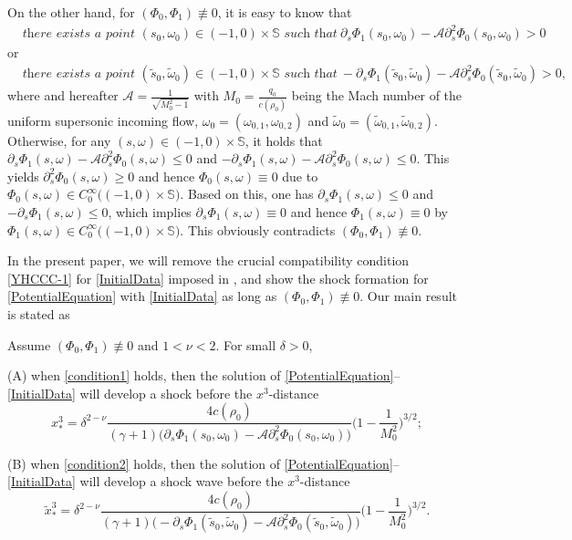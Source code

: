 \documentclass[11pt,twoside]{article}
\def\f{\frac}
\def\dps{\displaystyle}
\begin{document}
On the other hand, for $(\Phi_0, \Phi_1)\not\equiv0$, it is easy to know that
\begin{align}\label{condition1}
&\textit{there exists a point $(s_0, \omega_0) \in (-1, 0) \times \mathbb{S}$\ such that}\ \partial_s\Phi_1(s_0,\omega_0)-\mathcal A\partial_s^2\Phi_0(s_0,\omega_0)>0
\end{align}
or
\begin{align}\label{condition2}
&\textit{there exists a point $(\tilde s_0, \tilde\omega_0) \in (-1, 0) \times \mathbb{S}$\  such that}\ -\partial_s\Phi_1(\tilde s_0,\tilde \omega_0)-\mathcal A\partial_s^2\Phi_0(\tilde s_0,\tilde \omega_0)>0,
\end{align}
where and hereafter $\mathcal A=\dps\frac{1}{\sqrt{M_0^2-1}}$ with $M_0=\dps\f{q_0}{c(\rho_0)}$ being the Mach number of the
uniform supersonic incoming flow, $\omega_0=(\omega_{0,1},\omega_{0,2})$ and $\tilde\omega_0=(\tilde\omega_{0,1}, \tilde\omega_{0,2})$.
Otherwise, for any $(s, \omega) \in (-1, 0) \times \mathbb{S}$, it holds that
$\partial_s\Phi_1(s,\omega)-\mathcal A\partial_s^2\Phi_0(s,\omega)\le 0$
and $-\partial_s\Phi_1(s,\omega)-\mathcal A\partial_s^2\Phi_0(s,\omega)\le 0$.
This yields $\partial_s^2\Phi_0(s,\omega)\ge 0$ and hence $\Phi_0(s,\omega)\equiv0$ due to $\Phi_0(s, \omega) \in C_0^\infty\big((-1, 0) \times \mathbb{S}\big)$. Based on this, one has $\partial_s\Phi_1(s,\omega)\le 0$
and $-\partial_s\Phi_1(s,\omega)\le 0$, which implies $\partial_s\Phi_1(s,\omega)\equiv0$
and hence $\Phi_1(s,\omega)\equiv0$ by $\Phi_1(s, \omega) \in C_0^\infty\big((-1, 0) \times \mathbb{S}\big)$.
This obviously contradicts $(\Phi_0, \Phi_1)\not\equiv0$.


In the present paper, we will remove the crucial compatibility condition \eqref{YHCCC-1}  for \eqref{InitialData} imposed
in \cite{Ch2,K-R,M-Y,L-Y}, and show the shock formation for \eqref{PotentialEquation}
with \eqref{InitialData} as long as $(\Phi_0, \Phi_1)\not\equiv0$. Our main result is stated as


\begin{theorem}\label{maintheorem}
Assume $(\Phi_0, \Phi_1)\not\equiv 0$ and $1<\nu<2$. For small $\delta>0$,

(A) when \eqref{condition1} holds, then the solution of \eqref{PotentialEquation}--\eqref{InitialData}
will develop a shock before the $x^3$-distance
\begin{equation}\label{distance1}
x^3_* = \delta^{2-\nu}\frac{4c(\rho_0)}{(\gamma+1)\big(\partial_s\Phi_1(s_0,\omega_0)-\mathcal A\partial_s^2\Phi_0(s_0,\omega_0)\big)}\big(1-\frac{1}{M_0^2}\big)^{3/2};
\end{equation}

(B) when \eqref{condition2} holds,
then the solution of  \eqref{PotentialEquation}--\eqref{InitialData} will develop a shock wave before the $x^3$-distance
\begin{equation}\label{distance2}
\tilde x^3_* = \delta^{2-\nu}\frac{4c(\rho_0)}{(\gamma+1)\big(-\partial_s\Phi_1(\tilde s_0,\tilde \omega_0)-\mathcal A\partial_s^2\Phi_0(\tilde s_0,\tilde \omega_0)\big)}\big(1-\frac{1}{M_0^2}\big)^{3/2}.
\end{equation}
\end{theorem}
\end{document}
